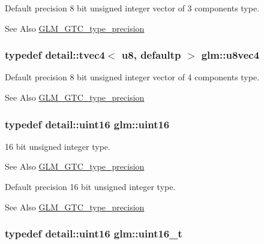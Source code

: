 Default precision 8 bit unsigned integer vector of 3 components type. \begin{DoxySeeAlso}{See Also}
\hyperlink{group__gtc__type__precision}{G\-L\-M\-\_\-\-G\-T\-C\-\_\-type\-\_\-precision} 
\end{DoxySeeAlso}
\hypertarget{group__gtc__type__precision_gaaf6b3d127698d893de8652deedfd3d9b}{
\subsubsection[{u8vec4}]{\setlength{\rightskip}{0pt plus 5cm}typedef detail\-::tvec4$<$ u8, defaultp $>$ {\bf glm\-::u8vec4}}}\label{group__gtc__type__precision_gaaf6b3d127698d893de8652deedfd3d9b}
Default precision 8 bit unsigned integer vector of 4 components type. \begin{DoxySeeAlso}{See Also}
\hyperlink{group__gtc__type__precision}{G\-L\-M\-\_\-\-G\-T\-C\-\_\-type\-\_\-precision} 
\end{DoxySeeAlso}
\hypertarget{group__gtc__type__precision_gad8c2939e1fdd8e5828b31d95c52255d5}{
\subsubsection[{uint16}]{\setlength{\rightskip}{0pt plus 5cm}typedef detail\-::uint16 {\bf glm\-::uint16}}}\label{group__gtc__type__precision_gad8c2939e1fdd8e5828b31d95c52255d5}
16 bit unsigned integer type. \begin{DoxySeeAlso}{See Also}
\hyperlink{group__gtc__type__precision}{G\-L\-M\-\_\-\-G\-T\-C\-\_\-type\-\_\-precision}
\end{DoxySeeAlso}
Default precision 16 bit unsigned integer type. \begin{DoxySeeAlso}{See Also}
\hyperlink{group__gtc__type__precision}{G\-L\-M\-\_\-\-G\-T\-C\-\_\-type\-\_\-precision} 
\end{DoxySeeAlso}
\hypertarget{group__gtc__type__precision_gac4eb4f43cae8129b00086dc234d3b8fc}{
\subsubsection[{uint16\-\_\-t}]{\setlength{\rightskip}{0pt plus 5cm}typedef detail\-::uint16 {\bf glm\-::uint16\-\_\-t}}}\label{group__gtc__type__precision_gac4eb4f43cae8129b00086dc234d3b8fc}
